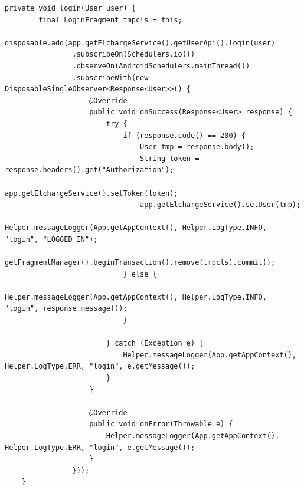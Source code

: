 \begin{lstlisting}[label=list:android_login_async,caption=Logowanie: wysłanie zapytania i obsługa odpowiedzi,basicstyle=\tiny\ttfamily]
    private void login(User user) {
        final LoginFragment tmpcls = this;
        disposable.add(app.getElchargeService().getUserApi().login(user)
                .subscribeOn(Schedulers.io())
                .observeOn(AndroidSchedulers.mainThread())
                .subscribeWith(new DisposableSingleObserver<Response<User>>() {
                    @Override
                    public void onSuccess(Response<User> response) {
                        try {
                            if (response.code() == 200) {
                                User tmp = response.body();
                                String token = response.headers().get("Authorization");
                                app.getElchargeService().setToken(token);
                                app.getElchargeService().setUser(tmp);
                                Helper.messageLogger(App.getAppContext(), Helper.LogType.INFO, "login", "LOGGED IN");
                                getFragmentManager().beginTransaction().remove(tmpcls).commit();
                            } else {
                                Helper.messageLogger(App.getAppContext(), Helper.LogType.INFO, "login", response.message());
                            }

                        } catch (Exception e) {
                            Helper.messageLogger(App.getAppContext(), Helper.LogType.ERR, "login", e.getMessage());
                        }
                    }

                    @Override
                    public void onError(Throwable e) {
                        Helper.messageLogger(App.getAppContext(), Helper.LogType.ERR, "login", e.getMessage());
                    }
                }));
    }
\end{lstlisting}

